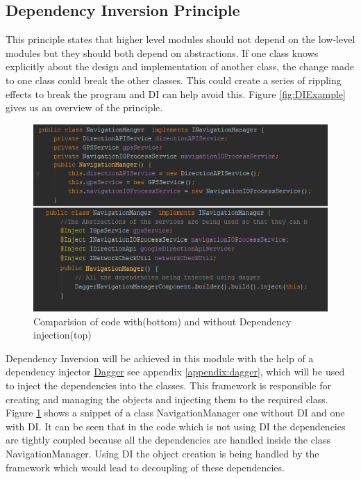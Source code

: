 \subsection{Dependency Inversion Principle}
    This principle states that higher level modules should not depend on 
    the low-level modules but they should both depend on abstractions. If one class 
    knows explicitly about the design and implementation of another class,
    the change made to one class could break the other classes. This could
    create a series of rippling effects to break the program and DI can help avoid this. Figure
    \ref{fig:DIExample} gives us an overview of the principle.

    \begin{figure}[htbp!]
        \centering \includegraphics{grafiken/di_compare.png}
        \caption{Comparision of code with(bottom) and without Dependency injection(top)}
        \label{fig:DIComparision}
    \end{figure}

    \par
        Dependency Inversion will be achieved in this module with the help of a dependency
        injector \href{http://square.github.io/dagger/}{Dagger} 
        see appendix \ref{appendix:dagger}, 
        which 
        will be used to inject the dependencies into the classes. 
        This framework is responsible for creating and managing the 
        objects and injecting them to the required
        class. 
        Figure \ref{fig:DIComparision} shows a snippet of a class 
        NavigationManager one without DI and one with DI.
        It can be seen that in the code which is not using 
        DI the dependencies are tightly coupled because all the
        dependencies are handled inside the class NavigationManager.
        Using DI the object creation is being handled by the
        framework which would lead to decoupling of these dependencies.

    
        